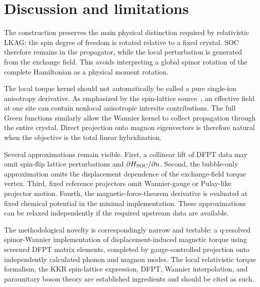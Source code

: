 \section{Discussion and limitations}
\label{sec:discussion}

The construction preserves the main physical distinction required by relativistic LKAG: the spin degree of freedom is rotated relative to a fixed crystal. SOC therefore remains in the propagator, while the local perturbation is generated from the exchange field. This avoids interpreting a global spinor rotation of the complete Hamiltonian as a physical moment rotation.

The local torque kernel should not automatically be called a pure single-ion anisotropy derivative. As emphasized by the spin-lattice source~\cite{Mankovsky2023SLC}, an effective field at one site can contain nonlocal anisotropic intersite contributions. The full Green functions similarly allow the Wannier kernel to collect propagation through the entire crystal. Direct projection onto magnon eigenvectors is therefore natural when the objective is the total linear hybridization.

Several approximations remain visible. First, a collinear lift of DFPT data may omit spin-flip lattice perturbations and $\partial H_{\rm SOC}/\partial u$. Second, the bubble-only approximation omits the displacement dependence of the exchange-field torque vertex. Third, fixed reference projectors omit Wannier-gauge or Pulay-like projector motion. Fourth, the magnetic-force-theorem derivative is evaluated at fixed chemical potential in the minimal implementation. These approximations can be relaxed independently if the required upstream data are available.

The methodological novelty is correspondingly narrow and testable: a q-resolved spinor-Wannier implementation of displacement-induced magnetic torque using screened DFPT matrix elements, completed by gauge-controlled projection onto independently calculated phonon and magnon modes. The local relativistic torque formalism, the KKR spin-lattice expression, DFPT, Wannier interpolation, and paraunitary boson theory are established ingredients and should be cited as such.
